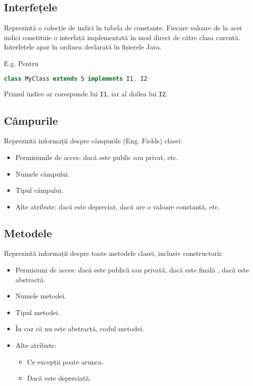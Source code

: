 \subsection{Interfețele}

Reprezintă o colecție de indici în tabela de constante. Fiecare valoare
de la acei indici constituie o interfață implementată în mod direct de
către clasa curentă. Interfețele apar în ordinea declarată în fișierele
Java.

E.g. Pentru

\begin{lstlisting}[language=Java]
class MyClass extends S implements I1, I2
\end{lstlisting}

Primul indice ar corespunde lui \texttt{I1}, iar al doilea lui
\texttt{I2}.

\subsection{Câmpurile}\label{campurile}

Reprezintă informații despre câmpurile (Eng. Fields) clasei:
\begin{itemize}
	\item Permisiunile de acces: dacă este public sau privat, etc.
	\item Numele câmpului.
	\item Tipul câmpului.
	\item Alte atribute: dacă este depreciat, dacă are o valoare constantă, etc.
\end{itemize}

\subsection{Metodele}\label{metodele}

Reprezintă informații despre toate metodele clasei, inclusiv
constructorii:

\begin{itemize}
	\item Permisiuni de acces: dacă este publică sau privată,
        dacă este finală , dacă este abstractă.
	\item Numele metodei.
	\item Tipul metodei.
	\item În caz că nu este abstractă, codul metodei.
	\item Alte atribute:
	      \begin{itemize}
		      \item Ce excepții poate arunca.
		      \item Dacă este depreciată.
	      \end{itemize}
\end{itemize}

